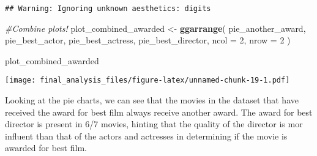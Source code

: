 \documentclass[]{article}
\newenvironment{Shaded}{\begin{snugshade}}{\end{snugshade}}
\newcommand{\KeywordTok}[1]{\textcolor[rgb]{0.13,0.29,0.53}{\textbf{#1}}}
\newcommand{\DataTypeTok}[1]{\textcolor[rgb]{0.13,0.29,0.53}{#1}}
\newcommand{\DecValTok}[1]{\textcolor[rgb]{0.00,0.00,0.81}{#1}}
\newcommand{\StringTok}[1]{\textcolor[rgb]{0.31,0.60,0.02}{#1}}
\newcommand{\CommentTok}[1]{\textcolor[rgb]{0.56,0.35,0.01}{\textit{#1}}}
\newcommand{\NormalTok}[1]{#1}
\begin{document}
\begin{verbatim}
## Warning: Ignoring unknown aesthetics: digits
\end{verbatim}

\begin{Shaded}
\begin{Highlighting}[]
 \CommentTok{#Combine plots!}
\NormalTok{ plot_combined_awarded <-}
\StringTok{   }\KeywordTok{ggarrange}\NormalTok{(}
\NormalTok{     pie_another_award,}
\NormalTok{     pie_best_actor,}
\NormalTok{    pie_best_actress,}
\NormalTok{    pie_best_director,}
    \DataTypeTok{ncol =} \DecValTok{2}\NormalTok{,}
    \DataTypeTok{nrow =} \DecValTok{2}
\NormalTok{  )}

\NormalTok{plot_combined_awarded}
\end{Highlighting}
\end{Shaded}

\texttt{[image: final\_analysis\_files/figure-latex/unnamed-chunk-19-1.pdf]}

Looking at the pie charts, we can see that the movies in the dataset
that have received the award for best film always receive another award.
The award for best director is present in 6/7 movies, hinting that the
quality of the director is mor influent than that of the actors and
actresses in determining if the movie is awarded for best film.
\end{document}

